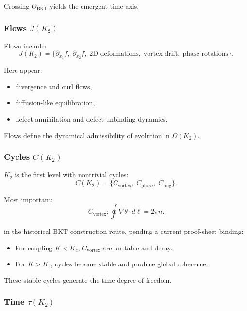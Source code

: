 Crossing $\Theta_{\mathrm{BKT}}$ yields the emergent time axis.

\subsubsection{Flows \texorpdfstring{$J(K_2)$}{J(K_2)}}

Flows include:
\[
J(K_2) = \{\partial_{x_1} f,\; \partial_{x_2} f,\;
\text{2D deformations},\; \text{vortex drift},\; \text{phase rotations}\}.
\]

Here appear:
\begin{itemize}
    \item divergence and curl flows,
    \item diffusion-like equilibration,
    \item defect-annihilation and defect-unbinding dynamics.
\end{itemize}

Flows define the dynamical admissibility of evolution in $\Omega(K_2)$.

\subsubsection{Cycles \texorpdfstring{$C(K_2)$}{C(K_2)}}

$K_2$ is the first level with nontrivial cycles:
\[
C(K_2) = \{C_{\mathrm{vortex}},\; C_{\mathrm{phase}},\; C_{\mathrm{ring}}\}.
\]

Most important:
\[
C_{\mathrm{vortex}}: \oint \nabla \theta \cdot d\ell = 2\pi n.
\]

in the historical BKT construction route, pending a current proof-sheet binding:
\begin{itemize}
    \item For coupling $K < K_c$, $C_{\mathrm{vortex}}$ are unstable and
          decay.
    \item For $K > K_c$, cycles become stable and produce global
          coherence.
\end{itemize}

These stable cycles generate the time degree of freedom.

\subsubsection{Time \texorpdfstring{$\tau(K_2)$}{\tau(K_2)}}

